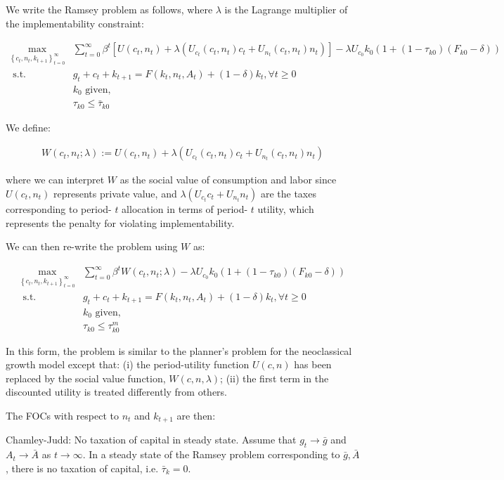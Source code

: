 \documentclass[10pt]{article}
\begin{document}
We write the Ramsey problem as follows, where 
$\lambda$ is the Lagrange multiplier of the 
implementability constraint:

\begin{align}
    \max _{\left\{c_t, n_t, k_{t+1}\right\}_{t=0}^{\infty}} &\sum_{t=0}^{\infty} \beta^t\left[U\left(c_t, n_t\right)+\lambda\left(U_{c_t}\left(c_t, n_t\right) c_t+U_{n_t}\left(c_t, n_t\right) n_t\right)\right]-\lambda U_{c_0} k_0\left(1+\left(1-\tau_{k 0}\right)\left(F_{k 0}-\delta\right)\right) \\
    \text { s.t. } \quad & g_t+c_t+k_{t+1}=F\left(k_t, n_t, A_t\right)+(1-\delta) k_t, \forall t \geq 0 \\
    &k_0 \text { given, } \\
    &\tau_{k 0} \leq \bar{\tau}_{k 0}
\end{align}

We define:

\begin{align}
    W\left(c_t, n_t ; \lambda\right):=U\left(c_t, n_t\right)+\lambda\left(U_{c_t}\left(c_t, n_t\right) c_t+U_{n_t}\left(c_t, n_t\right) n_t\right)
\end{align}

where we can interpret 
$W$ as the social value of consumption and labor 
since $U\left(c_t, n_t\right)$ represents
private value, and $\lambda\left(U_{c_t} c_t+U_{n_t} n_t\right)$ are the taxes corresponding to period- $t$ allocation in terms of period- $t$ utility, which represents the penalty for violating implementability.

We can then re-write the problem using $W$ as:

\begin{align}
    \max _{\left\{c_t, n_t, k_{t+1}\right\}_{t=0}^{\infty}} & \sum_{t=0}^{\infty} \beta^t W\left(c_t, n_t ; \lambda\right)-\lambda U_{c_0} k_0\left(1+\left(1-\tau_{k 0}\right)\left(F_{k 0}-\delta\right)\right) \\
    \text { s.t. } & g_t+c_t+k_{t+1}=F\left(k_t, n_t, A_t\right)+(1-\delta) k_t, \forall t \geq 0 \\
    & k_0 \text { given, } \\
    & \tau_{k 0} \leq \tau_{k 0}^m
\end{align}

In this form, the problem is similar to the planner's problem for the neoclassical growth model except that: (i) the period-utility function $U(c, n)$ has been replaced by the social value function, $W(c, n, \lambda)$; (ii) the first term in the discounted utility is treated differently from others.

The FOCs with respect to $n_t$ 
and $k_{t+1}$ are then:


\begin{proposition} 
    Chamley-Judd: No taxation of capital in steady state. 
    Assume that $g_t \rightarrow \bar{g}$ and $A_t \rightarrow \bar{A}$ as 
    $t \rightarrow \infty$. 
    In a steady state of the Ramsey problem 
    corresponding to $\bar{g}, \bar{A}$, there is 
    no taxation of capital, i.e. $\bar{\tau}_k=0$.
\end{proposition}
\end{document}
